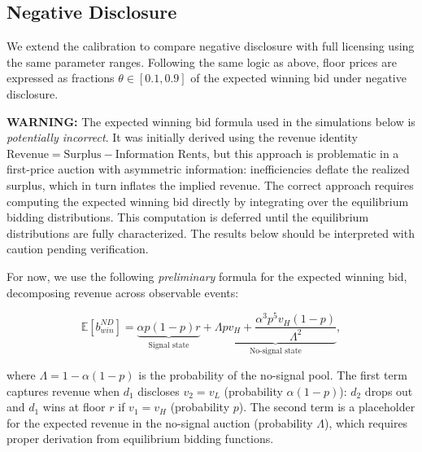\documentclass[11pt]{article}
\theoremstyle{plain}
\theoremstyle{definition}
\theoremstyle{plain}
\theoremstyle{plain}
\theoremstyle{plain}
\theoremstyle{plain}
\numberwithin{equation}{section}
\begin{document}
\vspace{4mm} 
\iffalse

\subsection{Negative Disclosure}\label{sect:calibration-ND}

We extend the calibration to compare negative disclosure with full licensing using the same parameter ranges. Following the same logic as above, floor prices are expressed as fractions $\theta \in [0.1, 0.9]$ of the expected winning bid under negative disclosure.

\vspace{2mm}

\noindent \textbf{WARNING:} The expected winning bid formula used in the simulations below is \textit{potentially incorrect}. It was initially derived using the revenue identity $\text{Revenue} = \text{Surplus} - \text{Information Rents}$, but this approach is problematic in a first-price auction with asymmetric information: inefficiencies deflate the realized surplus, which in turn inflates the implied revenue. The correct approach requires computing the expected winning bid directly by integrating over the equilibrium bidding distributions. This computation is deferred until the equilibrium distributions are fully characterized. The results below should be interpreted with caution pending verification.

\vspace{2mm}

\noindent For now, we use the following \textit{preliminary} formula for the expected winning bid, decomposing revenue across observable events:

\begin{equation*}
    \mathbb{E}[b_{win}^{ND}] = \underbrace{\alpha p(1-p) r}_{\text{Signal state}} + \underbrace{\Lambda p v_H + \frac{\alpha^3 p^5 v_H(1-p)}{\Lambda^2}}_{\text{No-signal state}},
\end{equation*}

\noindent where $\Lambda = 1 - \alpha(1-p)$ is the probability of the no-signal pool. The first term captures revenue when $d_1$ discloses $v_2 = v_L$ (probability $\alpha(1-p)$): $d_2$ drops out and $d_1$ wins at floor $r$ if $v_1 = v_H$ (probability $p$). The second term is a placeholder for the expected revenue in the no-signal auction (probability $\Lambda$), which requires proper derivation from equilibrium bidding functions.
\end{document}
